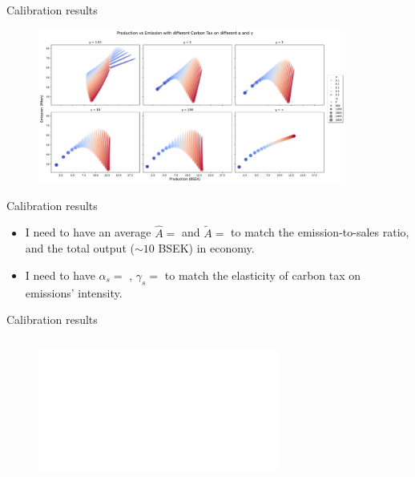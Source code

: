 \documentclass[aspectratio=169]{beamer}
\begin{document}
\begin{frame}{Calibration results}
	\begin{figure}[http]
		\centering
		\includegraphics[width=0.9\textwidth]{Figures/production_emission.pdf}
	\end{figure}
\end{frame}

\begin{frame}{Calibration results}
	\begin{itemize}
		\item I need to have an average $\hat{A}=$  and $\tilde{A} =$  to match the emission-to-sales ratio, and the total output ($\sim 10$ BSEK) in economy.
		\item I need to have $\alpha_s=$ , $\gamma_s = $  to match the elasticity of carbon tax on emissions' intensity.
	\end{itemize}
\end{frame}
\begin{frame}{Calibration results}
\begin{columns}
	\begin{columns}
		\begin{column}{0.7\textwidth}
			\begin{figure}[http]
				\centering
				\includegraphics<1->[width=\textwidth]{Figures/intensity_tax_premium.pdf}
			\end{figure}
		\end{column}
		\begin{column}{0.3\textwidth}
			\begin{table}
				{}
			\end{table}
		\end{column}
	\end{columns}
\end{columns}
\end{frame}
\end{document}
